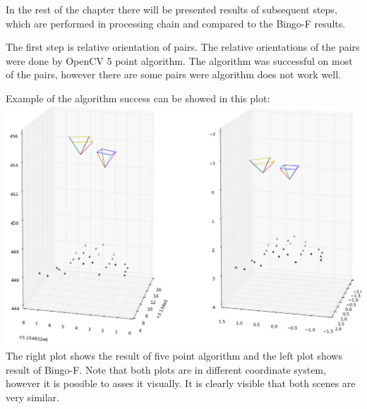 \documentclass[a4paper,12pt]{article}
\begin{document}
In the rest of the chapter there will be presented results of subsequent steps, which are performed in processing chain and compared 
to the Bingo-F results.

The first step is relative orientation of pairs. The relative orientations of the pairs were done by OpenCV 5 point algorithm.
The algorithm was successful on most of the pairs, however there are some pairs were algorithm does not work well.

Example of the algorithm success can be showed in this plot:
\includegraphics[scale=0.4]{figures/rel_or_576_598.png}
The right plot shows the result of five point algorithm and the left plot shows result of Bingo-F. Note that both 
plots are in different coordinate system, however it is possible to asses it visually. It is clearly visible
that both scenes are very similar.
\end{document}
